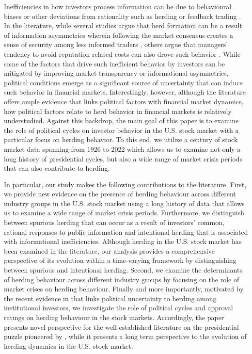 \documentclass[
  letterpaper,
  DIV=11,
  numbers=noendperiod]{scrartcl}
\begin{document}
Inefficiencies in how investors process information can be due to
behavioural biases or other deviations from rationality such as herding
or feedback trading \citep{aggarwal2014animal}. In the literature, while
several studies argue that herd formation can be a result of information
asymmetries wherein following the market consensus creates a sense of
security among less informed traders
\citep[e.g.][]{devenow1996rational}, others argue that managers'
tendency to avoid reputation related costs can also drove such behavior
\citep[e.g.][]{maug1996herding}. While some of the factors that drive
such inefficient behavior by investors can be mitigated by improving
market transparency or informational asymmetries, political conditions
emerge as a significant source of uncertainty that can induce such
behavior in financial markets. Interestingly, however, although the
literature offers ample evidence that links political factors with
financial market dynamics, how political factors relate to herd behavior
in financial markets is relatively understudied. Against this backdrop,
the main goal of this paper is to examine the role of political cycles
on investor behavior in the U.S. stock market with a particular focus on
herding behavior. To this end, we utilize a century of stock market data
spanning from 1926 to 2022 which allows us to examine not only a long
history of presidential cycles, but also a wide range of market crisis
periods that can also contribute to herding.

In particular, our study makes the following contributions to the
literature. First, we provide new evidence on the presence of herding
behaviour across different industry groups in the U.S. stock market
using a long history of data that allows us to examine a wide range of
market crisis periods. Furthermore, we distinguish between spurious
herding that can occur as a result of investors' common, rational
responses to public information and intentional herding that is
associated with informational inefficiencies. Although herding in the
U.S. stock market has been examined in the literature, our analysis
provides a comprehensive perspective of its evolution within a
time-varying framework by distinguishing between spurious and
intentional herding. Second, we examine the determinants of herding
behaviour across different industry groups by focusing on the role of
market crises on herding behaviour. Finally and more importantly,
motivated by the recent evidence in \citet{gavriilidis2024political}
that links political uncertainty to herding among institutional
investors, we investigate the role of political cycles and approval
ratings on herding behaviour in the stock markets. Accordingly, the
paper presents novel perspective for the well-established literature on
the presidential puzzle pioneered by \citet{santa2003presidential},
while it presents a long term perspective to the evolution of herding
dynamics in the U.S. stock market.
\end{document}

